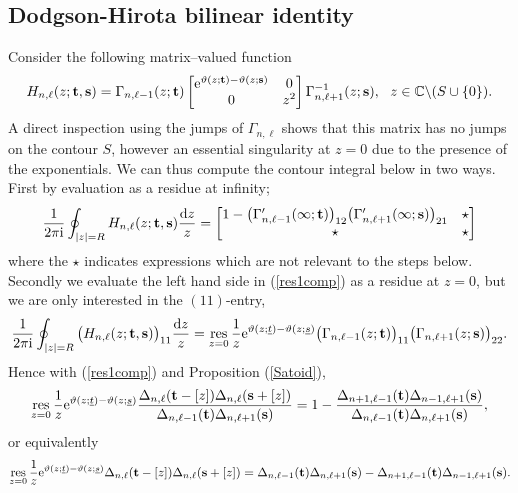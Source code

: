 \documentclass[10pt,reqno,oneside]{amsart}
\renewcommand{\d}{{\mathrm d}}
\newcommand{\im}{\mathrm{i}}
\numberwithin{equation}{section}
\newtheorem{theo}{Theorem}[section]
\def\un{\underline}
\def\res{\mathop{\mathrm {res}}\limits}
\def\bt{\begin{theo}}
\def\eqref#1{(\ref{#1})}
\def\bt{{\mathbf t}}
\begin{document}
\subsection{Dodgson-Hirota bilinear identity}
Consider the following matrix--valued function
\begin{equation*}
H_{n,\ell}(z;\bt, {\bf s}) =  \Gamma_{n,\ell-1}(z;\bt)\begin{bmatrix}
{\rm e}^{\vartheta(z;\bt)-\vartheta(z;{\bf s})} & 0\\
0 & z^2
\end{bmatrix}\Gamma_{n,\ell+1}^{-1}(z;{\bf s}),\ \ z\in\mathbb{C}\backslash(S\cup\{0\}).
%
\end{equation*}
A direct inspection using the jumps of $\Gamma_{n,\ell}$ shows that this matrix has no jumps on the contour $S$, however an essential singularity at $z=0$ due to the presence of the exponentials. We can thus compute the contour integral below in two ways. First by evaluation as a residue at infinity; 
\begin{equation}\label{res1comp}
\frac{1}{2\pi\im}\oint_{|z|=R}H_{n,\ell}(z;\bt, {\bf s})\frac {\d z}{z} = \begin{bmatrix}
 1-\big(\Gamma_{n,\ell-1}'(\infty;\bt )\big)_{12} \big(\Gamma_{n,\ell+1}'(\infty;{\bf s})\big)_{21} & \star \\
\star & \star
\end{bmatrix}
\end{equation}
where the $\star$ indicates expressions which are not relevant to the steps below. Secondly we evaluate the left hand side in \eqref{res1comp} as a residue at $z=0$, but we are only interested in the $(11)$-entry,
\begin{equation*}
	\frac{1}{2\pi\im}\oint_{|z|=R}\big(H_{n,\ell}(z;\bt, {\bf s})\big)_{11}\frac {\d z}{z}=\res_{z=0}\frac{1}{z}{\rm e}^{ \vartheta(z;\un t) - \vartheta(z;\un s) }\big(\Gamma_{n,\ell-1}(z;\bt)\big)_{11}\big(\Gamma_{n,\ell+1}(z;{\bf s})\big)_{22}.
\end{equation*}
Hence with \eqref{res1comp} and Proposition \eqref{Satoid},
\begin{equation*}
	\res_{z=0}\frac{1}{z}{\rm e}^{ \vartheta(z;\un t) - \vartheta(z;\un s) }\frac{\Delta_{n,\ell}(\bt-[z])\Delta_{n,\ell}({\bf s}+[z])}{\Delta_{n,\ell-1}(\bt)\Delta_{n,\ell+1}({\bf s})}=
	1-\frac{\Delta_{n+1,\ell-1}(\bt)\Delta_{n-1,\ell+1}({\bf s})}{\Delta_{n,\ell-1}(\bt)\Delta_{n,\ell+1}({\bf s})},
\end{equation*}
or equivalently
\begin{equation}\label{dog}
	\res_{z=0}\frac{1}{z}{\rm e}^{ \vartheta(z;\un t) - \vartheta(z;\un s) }\Delta_{n,\ell}(\bt-[z])\Delta_{n,\ell}({\bf s}+[z])=\Delta_{n,\ell-1}(\bt)\Delta_{n,\ell+1}({\bf s})-\Delta_{n+1,\ell-1}(\bt)\Delta_{n-1,\ell+1}({\bf s}).
\end{equation}
\end{document}
